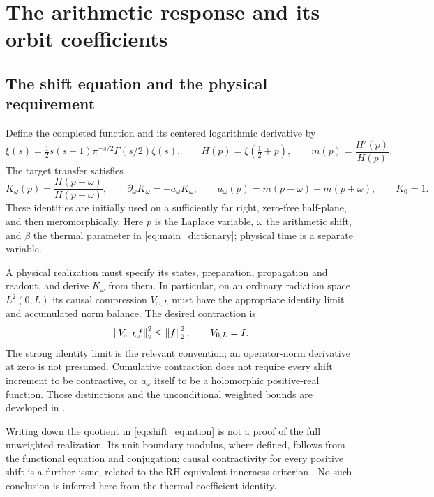 \section{The arithmetic response and its orbit coefficients}
\label{sec:target}

\subsection{The shift equation and the physical requirement}

Define the completed function and its centered logarithmic derivative by
\begin{equation}
 \xi(s)=\tfrac12s(s-1)\pi^{-s/2}\Gamma(s/2)\zeta(s),\qquad
 H(p)=\xi(\tfrac12+p),\qquad m(p)=\frac{H'(p)}{H(p)}.
\end{equation}
The target transfer satisfies
\begin{equation}
 K_\omega(p)=\frac{H(p-\omega)}{H(p+\omega)},\qquad
 \partial_\omega K_\omega=-a_\omega K_\omega,\qquad
 a_\omega(p)=m(p-\omega)+m(p+\omega),\qquad K_0=1.
 \label{eq:shift_equation}
\end{equation}
These identities are initially used on a sufficiently far right,
zero-free half-plane, and then meromorphically. Here $p$ is the Laplace
variable, $\omega$ the arithmetic shift, and $\beta$ the thermal
parameter in \eqref{eq:main_dictionary}; physical time is a separate
variable.

A physical realization must specify its states, preparation, propagation
and readout, and derive $K_\omega$ from them. In particular, on an
ordinary radiation space $L^2(0,L)$ its causal compression
$V_{\omega,L}$ must have the appropriate identity limit and accumulated
norm balance. The desired contraction is
\begin{equation}
 \left\lVert V_{\omega,L}f\right\rVert_2^2\le\left\lVert f\right\rVert_2^2,
 \qquad V_{0,L}=I.
 \label{eq:radiation_requirement}
\end{equation}
The strong identity limit is the relevant convention; an operator-norm
derivative at zero is not presumed. Cumulative contraction does not
require every shift increment to be contractive, or $a_\omega$ itself
to be a holomorphic positive-real function. Those distinctions and the
unconditional weighted bounds are developed in \cite{SourceNote}.

Writing down the quotient in \eqref{eq:shift_equation} is not a proof
of the full unweighted realization. Its unit boundary modulus, where
defined, follows from the functional equation and conjugation; causal
contractivity for every positive shift is a further issue, related to
the RH-equivalent innerness criterion \cite{Suzuki}. No such conclusion
is inferred here from the thermal coefficient identity.

